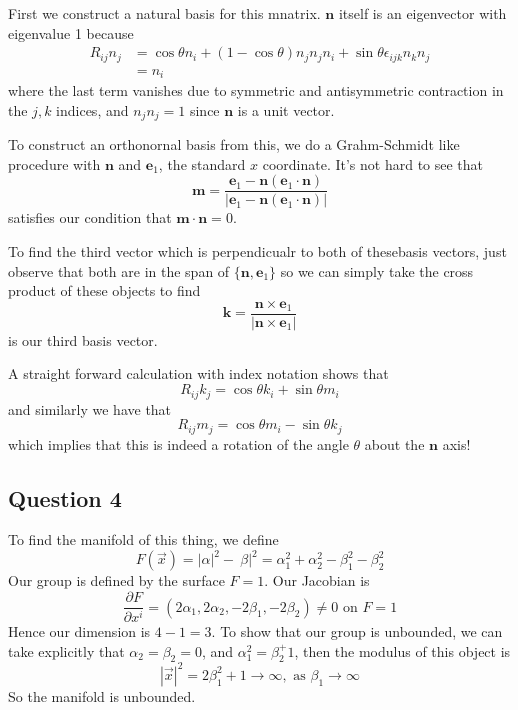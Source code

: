 \documentclass[11pt, oneside]{article}   	%
\theoremstyle{slanted}
\begin{document}
First we construct a natural basis for this mnatrix. $\mathbf{n}$ itself is an eigenvector with eigenvalue 1 because 
\begin{align*}
R_{ij}n_j  &= \cos \theta n_i + (1 - \cos\theta )n_j n_j n_i + \sin\theta \epsilon_{ijk} n_k n_j\\ 
&= n_i 
\end{align*}
where the last term vanishes due to symmetric and antisymmetric contraction in the $j, k$ indices, and $n_j n_j  = 1$ since $\mathbf{n}$ is a unit vector. 

To construct an orthonornal basis from this, we do a Grahm-Schmidt like procedure with $\mathbf{n}$ and $\mathbf{e}_1$, the standard $x$ coordinate. It's not hard to see that 
\[
\mathbf{m} = \frac{\mathbf{e}_1 - \mathbf{n}( \mathbf{e}_1 \cdot \mathbf{n})}{|\mathbf{e}_1 - \mathbf{n} (\mathbf{e}_1 \cdot \mathbf{n}) |} 
\]
satisfies our condition that $\mathbf{m} \cdot \mathbf{n} = 0$.

To find the third vector which is perpendicualr to both of thesebasis vectors, just observe that both are in the span of $\{ \mathbf{n}, \mathbf{e}_1 \} $ so we can simply take the cross product of these objects to find 
\[ 
\mathbf{k} = \frac{\mathbf{n} \times \mathbf{e}_1 }{|\mathbf{n} \times \mathbf{e}_1|}
\]  is our third basis vector. 

A straight forward calculation with index notation shows that \[ 
R_{ij} k_j = \cos\theta k_i + \sin \theta m_i
\] and similarly we have that 
\[ 
R_{ij} m_j = \cos\theta m_i - \sin \theta k_j 
\]
which implies that this is indeed a rotation of the angle $\theta$ about the $\mathbf{n}$ axis!


\pagebreak 
\subsection{Question 4} 
To find the manifold of this thing, 
we define 
\[
	F ( \vec{x} ) = | \alpha | ^ 2 - \ \beta | ^ 2 = \alpha_ 1 ^ 2 + \alpha_ 2 ^ 2 - \beta _ 1^ 2  - \beta _ 2 ^ 2
\] Our group is defined by the surface $ F = 1 $. 
Our Jacobian is 
 \[
	 \frac{\partial F  }{\partial x^ i }  = ( 2 \alpha_ 1 , 2 \alpha_ 2 , - 2 \beta _ 1 , - 2\beta _ 2 ) \neq 0 \text{ on } F = 1
\] Hence our dimension is $ 4 -1  = 3$. To show that 
our group is unbounded, we can take explicitly 
that $ \alpha _ 2 = \beta _ 2 = 0 $, and  $ \alpha_ 1 ^ 2 = \beta _ 2^ + 1 $, then 
the modulus of this object is 
 \[
 | \vec{x} | ^ 2 = 2 \beta_ 1 ^  2 + 1 \to \infty, \text{ as } \beta _ 1 \to \infty
\] So the manifold is unbounded.
\end{document}
